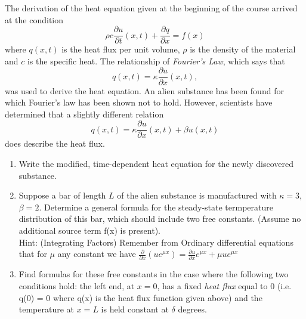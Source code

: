 
The derivation of the heat equation given at the beginning of the course arrived at the condition 
\[
\rho c \frac{\partial u}{\partial t} (x,t) + \frac{\partial q}{\partial x} = f(x)
\]
where $q(x,t)$ is the heat flux per unit volume, $\rho$ is the density of the material and $c$ is the specific heat.  The relationship of \textit{Fourier's Law}, which says that 
\[
q(x,t) = \kappa \frac{\partial u}{\partial x}(x,t),
\]
was used to derive the heat equation.  An alien substance has been found for which Fourier's law has been shown not to hold.  However, scientists have determined that a slightly different relation
\[
q(x,t) = \kappa\frac{\partial u}{\partial x}(x,t) + \beta u(x,t)
\]
does describe the heat flux.

\begin{enumerate}
\item Write the modified, time-dependent heat equation for the newly discovered substance.  

\item Suppose a bar of length $L$ of the alien substance is manufactured with $\kappa = 3$, $\beta = 2$.  Determine a general formula for the steady-state termperature distribution of this bar, which should include two free constants.  (Assume no additional source term f(x) is present). \\ \vspace{0.1em} Hint: (Integrating Factors) Remember from Ordinary differential equations that for $\mu$ any constant we have $\frac{\partial}{\partial x} \left( u e^{\mu x}\right) = \frac{\partial u}{\partial x} e^{\mu x} + \mu u e^{\mu x} $


\item Find formulas for these free constants in the case where the following two conditions hold: the left end, at $x=0$, has a fixed \textit{heat flux} equal to $0$ (i.e. q(0) = 0 where q(x) is the heat flux function given above) and the temperature at $x=L$ is held constant at $\delta$ degrees.



\end{enumerate}